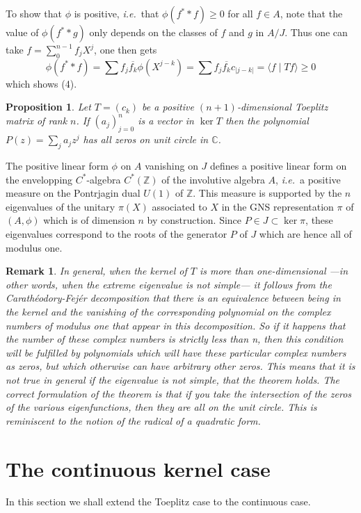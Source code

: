 \documentclass{amsart}
\newtheorem{prop}[thm]{Proposition}
\newtheorem{rem}[thm]{Remark}
\def\C{{\mathbb C}}
\def\Z{{\mathbb Z}}
\newcommand{\ie}{{\it i.e.\/}\ }
\def\C{{\mathbb C}}
\def\Z{{\mathbb Z}}
\begin{document}
To show that $\phi$ is positive, \ie that $\phi(f^**f)\geq 0$ for all $f\in A$, note that the value of $\phi(f^**g)$ only depends on the classes of $f$ and $g$ in $A/J$. Thus one can take $f=\sum_0^{n-1} f_jX^j$, one then gets 
$$
\phi(f^**f)=\sum f_j\overline{ f_k}\phi(X^{j-k})=\sum f_j\overline{ f_k}c_{\vert j-k\vert}=\langle f\mid Tf\rangle \geq 0
$$ 
which shows (4).
\endproof


\begin{prop}
\label{toeplitzcase}
  Let $T = (c_k)$ be a positive $(n+1)$-dimensional Toeplitz matrix of rank $n$. If $(a_j)_{j=0}^n$ is a vector in $\ker T$ then the polynomial $P(z) = \sum_j a_j z^j$ has all zeros on unit circle in $\C$. 
\end{prop}
\proof
The positive linear form $\phi$ on $A$ vanishing on $J$ defines a positive linear form on the envelopping $C^*$-algebra $C^*(\Z)$  of the involutive algebra $A$,  \ie a positive measure on the Pontrjagin dual $U(1)$ of $\Z$. 
This measure is supported by the $n$ eigenvalues of the unitary $\pi(X)$ associated to $X$ in the GNS representation $\pi$ of $(A,\phi)$ which is of dimension $n$ by construction.
 Since $P\in J\subset \ker \pi $, these eigenvalues correspond  to the roots of the generator $P$ of $J$ which are hence all of modulus one. 
\endproof

\begin{rem}
In general, when the kernel of $T$ is more than one-dimensional ---in other words, when the extreme eigenvalue is not simple--- it follows from the Carath\'eodory-Fej\'er decomposition that there is an equivalence between being in the kernel and the vanishing of the corresponding polynomial on the complex numbers of modulus one that appear in this decomposition. So if it happens that the number of these complex numbers is strictly less than n, then this condition will be fulfilled by polynomials which will have these particular complex numbers as zeros, but which otherwise can have arbitrary other zeros. This means that it is not true in general if the eigenvalue is not simple, that the theorem holds. The correct formulation of the theorem is that if you take the intersection of the zeros of the various eigenfunctions, then they are all on the unit circle. This is reminiscent to the notion of the radical of a quadratic form. 
  \end{rem}



\section{The continuous kernel case}
In this section we shall extend the Toeplitz case to the continuous case.
\end{document}
